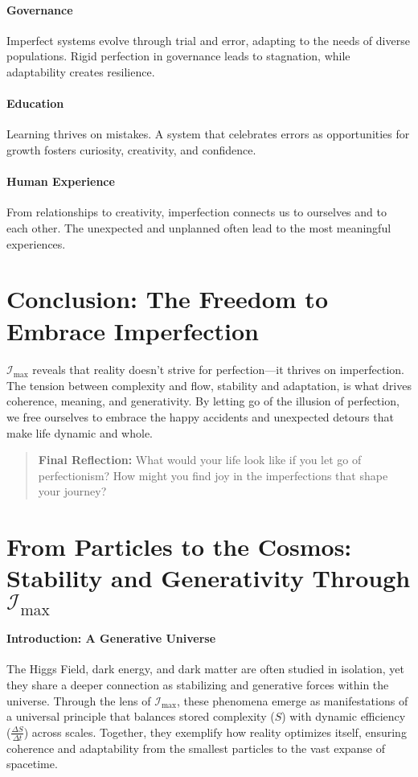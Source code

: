 \documentclass[12pt]{article}
\begin{document}
\paragraph{Governance} Imperfect systems evolve through trial and error, adapting to the needs of diverse populations. Rigid perfection in governance leads to stagnation, while adaptability creates resilience.

\paragraph{Education} Learning thrives on mistakes. A system that celebrates errors as opportunities for growth fosters curiosity, creativity, and confidence.

\paragraph{Human Experience} From relationships to creativity, imperfection connects us to ourselves and to each other. The unexpected and unplanned often lead to the most meaningful experiences.

\section*{Conclusion: The Freedom to Embrace Imperfection}
\paragraph{}
\(\mathcal{I}_{\text{max}}\) reveals that reality doesn’t strive for perfection—it thrives on imperfection. The tension between complexity and flow, stability and adaptation, is what drives coherence, meaning, and generativity. By letting go of the illusion of perfection, we free ourselves to embrace the happy accidents and unexpected detours that make life dynamic and whole.

\begin{quote}
\textbf{Final Reflection:}  
What would your life look like if you let go of perfectionism? How might you find joy in the imperfections that shape your journey?
\end{quote}


\section{From Particles to the Cosmos: Stability and Generativity Through \(\mathcal{I}_{\text{max}}\)}

\paragraph{Introduction: A Generative Universe}
The Higgs Field, dark energy, and dark matter are often studied in isolation, yet they share a deeper connection as stabilizing and generative forces within the universe. Through the lens of \(\mathcal{I}_{\text{max}}\), these phenomena emerge as manifestations of a universal principle that balances stored complexity (\(S\)) with dynamic efficiency (\(\frac{\Delta S}{\Delta t}\)) across scales. Together, they exemplify how reality optimizes itself, ensuring coherence and adaptability from the smallest particles to the vast expanse of spacetime.
\end{document}
